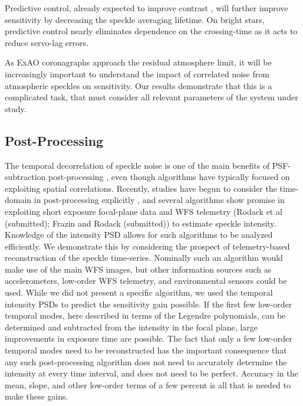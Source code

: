 \documentclass[10pt,preprint]{aastex631}
\begin{document}
Predictive control, already expected to improve contrast \citep{2007JOSAA..24.2645P,2017JOSAA..34.1877C,2018JATIS...4a9001M, 2021arXiv210307566H}, will further improve sensitivity by decreasing the speckle averaging lifetime.  On bright stars, predictive control nearly eliminates dependence on the crossing-time as it acts to reduce servo-lag errors.

As ExAO coronagraphs approach the residual atmosphere limit, it will be increasingly important to understand the impact of correlated noise from atmospheric speckles on sensitivity.  Our results demonstrate that this is a complicated task, that must consider all relevant parameters of the system under study.

\subsection{Post-Processing}
The temporal decorrelation of speckle noise is one of the main benefits of PSF-subtraction post-processing \citep{2006ApJ...641..556M,2008ApJ...673..647M}, even though algorithms have typically focused on exploiting spatial correlations.  Recently, studies have begun to consider the time-domain in post-processing explicitly \citep{2021A&A...646A..24S}, and several algorithms show promise in exploiting short exposure focal-plane data \citep{2019PASP..131k4506W, 2021arXiv210306898S} and WFS telemetry (Rodack et al (submitted); Frazin and Rodack (submitted)) to estimate speckle intensity.   Knowledge of the intensity PSD allows for such algorithms to be analyzed efficiently.  We demonstrate this by considering the prospect of telemetry-based reconstruction of the speckle time-series.  Nominally such an algorithm would make use of the main WFS images, but other information sources such as accelerometers, low-order WFS telemetry, and environmental sensors could be used.  While we did not present a specific algorithm, we used the temporal intensity PSDs to predict the sensitivity gain possible.  If the first few low-order temporal modes, here described in terms of the Legendre polynomials, can be determined and subtracted from the intensity in the focal plane, large improvements in exposure time are possible.  The fact that only a few low-order temporal modes need to be reconstructed has the important consequence that any such post-processing algorithm does not need to accurately determine the intensity at every time interval, and does not need to be perfect.  Accuracy in the mean, slope, and other low-order terms of a few percent is all that is needed to make these gains.
\end{document}
